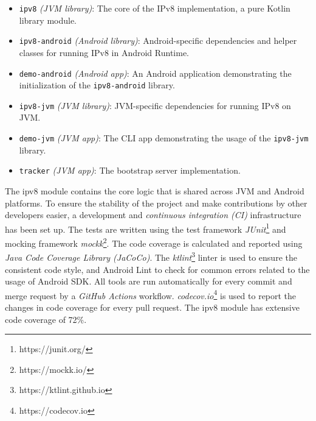 \begin{itemize}
    \item \texttt{ipv8} \textit{(JVM library)}: The core of the IPv8 implementation, a pure Kotlin library module.
    \item \texttt{ipv8-android} \textit{(Android library)}: Android-specific dependencies and helper classes for running IPv8 in Android Runtime.
    \item \texttt{demo-android} \textit{(Android app)}: An Android application demonstrating the initialization of the \texttt{ipv8-android} library.
    \item \texttt{ipv8-jvm} \textit{(JVM library)}: JVM-specific dependencies for running IPv8 on JVM.
    \item \texttt{demo-jvm} \textit{(JVM app)}: The CLI app demonstrating the usage of the \texttt{ipv8-jvm} library.
    \item \texttt{tracker} \textit{(JVM app)}: The bootstrap server implementation.
\end{itemize}

The ipv8 module contains the core logic that is shared across JVM and Android platforms. To ensure the stability of the project and make contributions by other developers easier, a development and \textit{continuous integration (CI)} infrastructure has been set up. The tests are written using the test framework \textit{JUnit}\footnote{https://junit.org/} and mocking framework \textit{mockk}\footnote{https://mockk.io/}. The code coverage is calculated and reported using \textit{Java Code Coverage Library (JaCoCo)}. The \textit{ktlint}\footnote{https://ktlint.github.io} linter is used to ensure the consistent code style, and Android Lint to check for common errors related to the usage of Android SDK. All tools are run automatically for every commit and merge request by a \textit{GitHub Actions} workflow. \textit{codecov.io}\footnote{https://codecov.io} is used to report the changes in code coverage for every pull request. The ipv8 module has extensive code coverage of 72\%.




